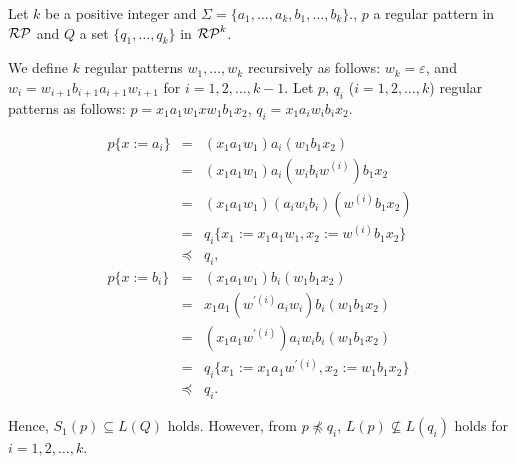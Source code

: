  \begin{ex}\label{counter-example4Theorem10}
     Let $k$ be a positive integer and $\Sigma= \{a_{1},\ldots,a_{k},b_{1},\ldots,b_{k}\}$., $p$ a regular pattern in $\mathcal{RP}$ and 
     $Q$ a set $\{q_{1},\ldots,q_{k}\}$ in $\mathcal{RP}^{k}$.
     
     We define $k$ regular patterns $w_{1},\ldots,w_{k}$ recursively as follows:
     $w_{k} = \varepsilon$, and 
         $w_{i} = w_{i+1}b_{i+1}a_{i+1}w_{i+1}$ for $i=1,2,\ldots,k-1$.
     Let $p$, $q_{i}$ ($i=1,2,\ldots,k$) regular patterns as follows:
     $p = x_{1}a_{1}w_{1}xw_{1}b_{1}x_{2}$, $q_{i} = x_{1}a_{i}w_{i}b_{i}x_{2}$.

     \begin{eqnarray*}
         p \{ x:=a_{i} \} & = & (x_{1}a_{1}w_{1})a_{i}(w_{1}b_{1}x_{2})\\
         & = & (x_{1}a_{1}w_{1})a_{i}(w_{i}b_{i}w^{(i)})b_{1}x_{2}\\
         & = & (x_{1}a_{1}w_{1})(a_{i}w_{i}b_{i})(w^{(i)}b_{1}x_{2})\\
         & = & q_{i} \{ x_{1} := x_{1}a_{1}w_{1}, x_{2} := w^{(i)}b_{1}x_{2} \}\\
         & \preceq & q_{i},\\
         p \{ x:=b_{i} \} & = & (x_{1}a_{1}w_{1})b_{i}(w_{1}b_{1}x_{2})\\
         & = & x_{1}a_{1}(w^{\prime (i)}a_{i}w_{i})b_{i}(w_{1}b_{1}x_{2}) \\
         & = & (x_{1}a_{1}w^{\prime (i)})a_{i}w_{i}b_{i}(w_{1}b_{1}x_{2}) \\
         & = & q_{i} \{ x_{1} := x_{1}a_{1}w^{\prime (i)}, x_{2} := w_{1}b_{1}x_{2} \}\\
         & \preceq & q_{i}.
     \end{eqnarray*}

    Hence, $S_{1}(p) \subseteq L(Q)$ holds.
    However, from $p \not \preceq q_{i}$, $L(p) \not \subseteq L(q_{i})$ holds for $i=1,2,\ldots,k$.
\end{ex}

